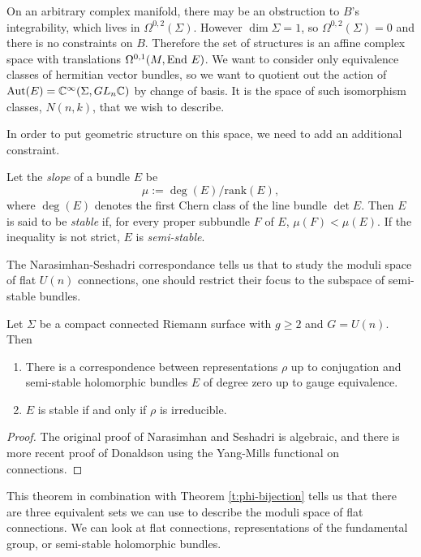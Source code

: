 	On an arbitrary complex manifold, there may be an obstruction to $B$'s integrability, which lives in $\Omega^{0,2}(\Sigma)$. However $\dim \Sigma = 1$, so $\Omega^{0,2}(\Sigma)=0$ and there is no constraints on $B$. Therefore the set of structures is an affine complex space with translations $\Omega^{0,1}(M,\text{End } E)$. We want to consider only equivalence classes of hermitian vector bundles, so we want to quotient out the action of $\text{Aut}(E) = \mathbb{C}^\infty(\Sigma, GL_n\mathbb{C})$ by change of basis. It is the space of such isomorphism classes, $N(n,k)$, that we wish to describe. 
	
	In order to put geometric structure on this space, we need to add an additional constraint.
	\begin{definition}
		\label{d:stable}
		Let the \emph{slope} of a bundle $E$ be
		$$\mu := \deg(E)/\text{rank}(E),$$
		where $\deg(E)$ denotes the first Chern class of the line bundle $\det E$. Then $E$ is said to be \textit{stable} if, for every proper subbundle $F$ of $E$, $\mu(F) < \mu(E)$. If the inequality is not strict, $E$ is \textit{semi-stable}.
	\end{definition}

	The Narasimhan-Seshadri correspondance tells us that to study the moduli space of flat $U(n)$ connections, one should restrict their focus to the subspace of semi-stable bundles.
	\begin{theorem}
		\label{t:n-s}
		Let $\Sigma$ be a compact connected Riemann surface with $g\geq 2$ and $G=U(n)$. Then 
		\begin{enumerate}
			\item There is a correspondence between representations $\rho$ up to conjugation and semi-stable holomorphic bundles $E$ of degree zero up to gauge equivalence.
			\item $E$ is stable if and only if $\rho$ is irreducible.
		\end{enumerate}
	\end{theorem}
	\begin{proof}
		The original proof of Narasimhan and Seshadri \cite{narasimhan_stable_1965} is algebraic, and there is more recent proof of Donaldson \cite{donaldson_new_1983} using the Yang-Mills functional on connections.
	\end{proof}
	This theorem in combination with Theorem \ref{t:phi-bijection} tells us that there are three equivalent sets we can use to describe the moduli space of flat connections. We can look at flat connections, representations of the fundamental group, or semi-stable holomorphic bundles.
	
